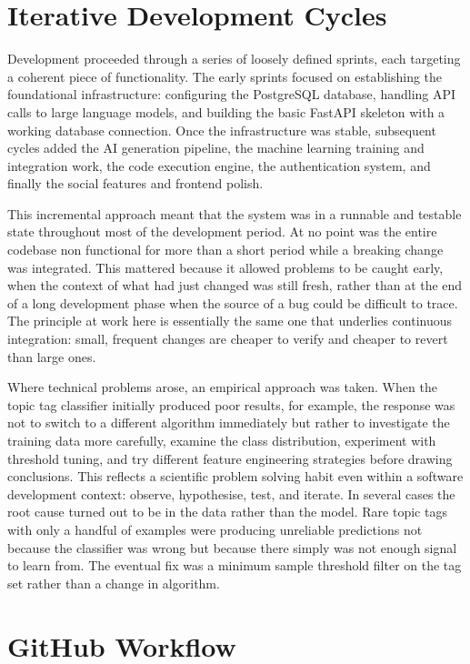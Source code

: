 \section{Iterative Development Cycles}

Development proceeded through a series of loosely defined sprints, each
targeting a coherent piece of functionality. The early sprints focused on
establishing the foundational infrastructure: configuring the PostgreSQL
database, handling API calls to large language models, and building the
basic FastAPI skeleton with a working database connection. Once the
infrastructure was stable, subsequent cycles added the AI generation
pipeline, the machine learning training and integration work, the code
execution engine, the authentication system, and finally the social
features and frontend polish.

This incremental approach meant that the system was in a runnable and
testable state throughout most of the development period. At no point was
the entire codebase non functional for more than a short period while a
breaking change was integrated. This mattered because it allowed problems
to be caught early, when the context of what had just changed was still
fresh, rather than at the end of a long development phase when the source
of a bug could be difficult to trace. The principle at work here is
essentially the same one that underlies continuous integration: small,
frequent changes are cheaper to verify and cheaper to revert than large
ones.

Where technical problems arose, an empirical approach was taken. When the
topic tag classifier initially produced poor results, for example, the
response was not to switch to a different algorithm immediately but rather
to investigate the training data more carefully, examine the class
distribution, experiment with threshold tuning, and try different feature
engineering strategies before drawing conclusions. This reflects a
scientific problem solving habit even within a software development
context: observe, hypothesise, test, and iterate. In several cases the
root cause turned out to be in the data rather than the model. Rare topic
tags with only a handful of examples were producing unreliable predictions
not because the classifier was wrong but because there simply was not
enough signal to learn from. The eventual fix was a minimum sample
threshold filter on the tag set rather than a change in algorithm.

\section{GitHub Workflow}

